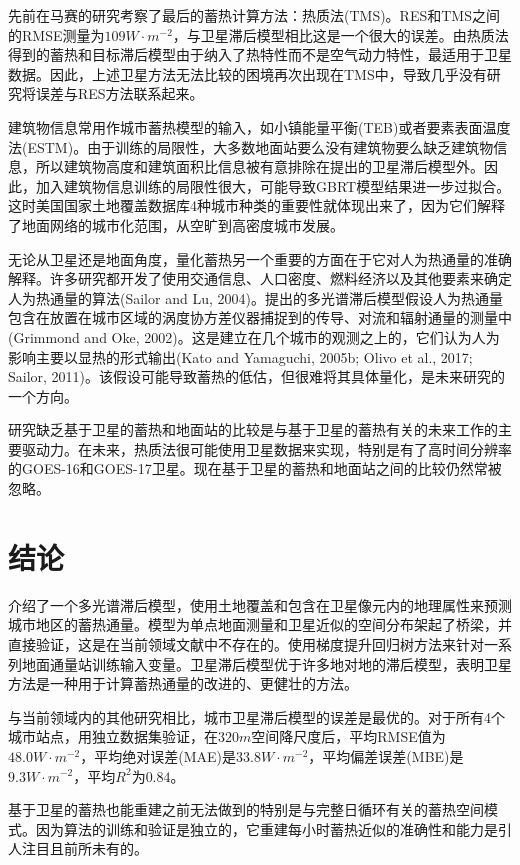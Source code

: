 \documentclass[3p,times]{elsarticle}
\begin{document}
先前在马赛的研究考察了最后的蓄热计算方法：热质法(TMS)。RES和TMS之间的RMSE测量为$109W\cdot m^{-2}$，与卫星滞后模型相比这是一个很大的误差。由热质法得到的蓄热和目标滞后模型由于纳入了热特性而不是空气动力特性，最适用于卫星数据。因此，上述卫星方法无法比较的困境再次出现在TMS中，导致几乎没有研究将误差与RES方法联系起来。

建筑物信息常用作城市蓄热模型的输入，如小镇能量平衡(TEB)或者要素表面温度法(ESTM)。由于训练的局限性，大多数地面站要么没有建筑物要么缺乏建筑物信息，所以建筑物高度和建筑面积比信息被有意排除在提出的卫星滞后模型外。因此，加入建筑物信息训练的局限性很大，可能导致GBRT模型结果进一步过拟合。这时美国国家土地覆盖数据库4种城市种类的重要性就体现出来了，因为它们解释了地面网络的城市化范围，从空旷到高密度城市发展。

无论从卫星还是地面角度，量化蓄热另一个重要的方面在于它对人为热通量的准确解释。许多研究都开发了使用交通信息、人口密度、燃料经济以及其他要素来确定人为热通量的算法(Sailor and Lu, 2004)。提出的多光谱滞后模型假设人为热通量包含在放置在城市区域的涡度协方差仪器捕捉到的传导、对流和辐射通量的测量中(Grimmond and Oke, 2002)。这是建立在几个城市的观测之上的，它们认为人为影响主要以显热的形式输出(Kato and Yamaguchi, 2005b; Olivo et al., 2017; Sailor, 2011)。该假设可能导致蓄热的低估，但很难将其具体量化，是未来研究的一个方向。

研究缺乏基于卫星的蓄热和地面站的比较是与基于卫星的蓄热有关的未来工作的主要驱动力。在未来，热质法很可能使用卫星数据来实现，特别是有了高时间分辨率的GOES-16和GOES-17卫星。现在基于卫星的蓄热和地面站之间的比较仍然常被忽略。

\section{结论}

介绍了一个多光谱滞后模型，使用土地覆盖和包含在卫星像元内的地理属性来预测城市地区的蓄热通量。模型为单点地面测量和卫星近似的空间分布架起了桥梁，并直接验证，这是在当前领域文献中不存在的。使用梯度提升回归树方法来针对一系列地面通量站训练输入变量。卫星滞后模型优于许多地对地的滞后模型，表明卫星方法是一种用于计算蓄热通量的改进的、更健壮的方法。

与当前领域内的其他研究相比，城市卫星滞后模型的误差是最优的。对于所有4个城市站点，用独立数据集验证，在$320m$空间降尺度后，平均RMSE值为$48.0W\cdot m^{-2}$，平均绝对误差(MAE)是$33.8W\cdot m^{-2}$，平均偏差误差(MBE)是$9.3W\cdot m^{-2}$，平均$R^2$为$0.84$。

基于卫星的蓄热也能重建之前无法做到的特别是与完整日循环有关的蓄热空间模式。因为算法的训练和验证是独立的，它重建每小时蓄热近似的准确性和能力是引人注目且前所未有的。
\end{document}
